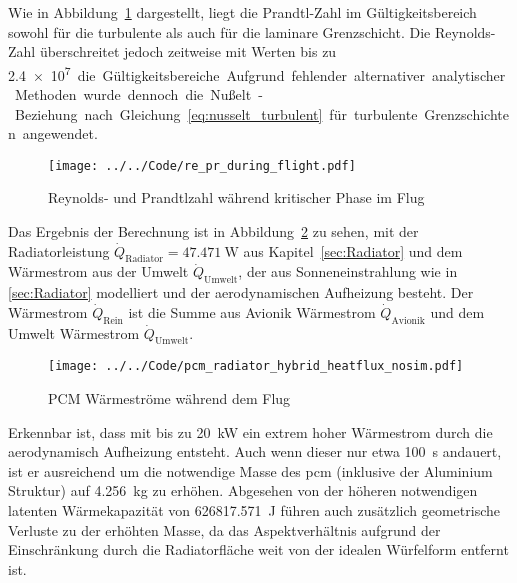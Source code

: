 Wie in Abbildung~\ref{fig:re_pr_flugsimulation} dargestellt, liegt die Prandtl-Zahl im Gültigkeitsbereich sowohl für die turbulente als auch
für die laminare Grenzschicht. Die Reynolds-Zahl überschreitet jedoch zeitweise mit Werten bis zu \SI{2.4e7} die Gültigkeitsbereiche.
Aufgrund fehlender alternativer analytischer Methoden wurde dennoch die Nußelt-Beziehung nach Gleichung~\ref{eq:nusselt_turbulent} für turbulente Grenzschichten angewendet.

\begin{figure}
  \centering
  \texttt{[image: ../../Code/re\_pr\_during\_flight.pdf]}
  \caption{Reynolds- und Prandtlzahl während kritischer Phase im Flug}\label{fig:re_pr_flugsimulation}
\end{figure}

Das Ergebnis der Berechnung ist in Abbildung~\ref{fig:pcm_waermestrom_vorauslegung} zu sehen, mit der Radiatorleistung $\dot{Q}_\mathrm{Radiator} = \SI{47.471}{\watt}$
aus Kapitel~\ref{sec:Radiator} und dem Wärmestrom aus der Umwelt $\dot{Q}_\mathrm{Umwelt}$, der aus Sonneneinstrahlung wie in \ref{sec:Radiator} modelliert
und der aerodynamischen Aufheizung besteht.
Der Wärmestrom $\dot{Q}_\mathrm{Rein}$ ist die Summe aus Avionik Wärmestrom $\dot{Q}_\mathrm{Avionik}$ und dem Umwelt Wärmestrom $\dot{Q}_\mathrm{Umwelt}$.

\begin{figure}[H]
  \centering
  \texttt{[image: ../../Code/pcm\_radiator\_hybrid\_heatflux\_nosim.pdf]}
  \caption{PCM Wärmeströme während dem Flug}\label{fig:pcm_waermestrom_vorauslegung}
\end{figure}

Erkennbar ist, dass mit bis zu \SI{20}{\kilo\watt} ein extrem hoher Wärmestrom durch die aerodynamisch Aufheizung entsteht.
Auch wenn dieser nur etwa \SI{100}{\second} andauert, ist er ausreichend um die notwendige Masse des \ac{pcm} (inklusive der Aluminium Struktur)
auf \SI{4,256}{\kilo\gram} zu erhöhen. Abgesehen von der höheren notwendigen latenten Wärmekapazität von \SI{626817.571}{\joule} führen auch zusätzlich geometrische
Verluste zu der erhöhten Masse, da das Aspektverhältnis aufgrund der Einschränkung durch die Radiatorfläche weit von der idealen Würfelform entfernt ist.